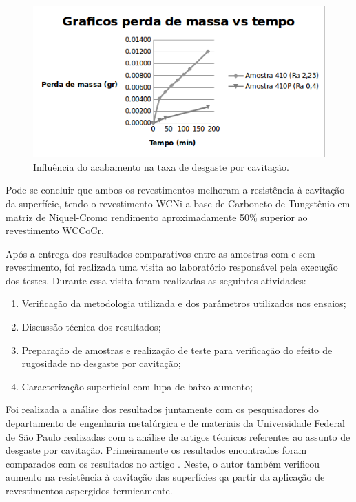 \begin{figure}
	\centering
	\includegraphics[width=1\columnwidth]{method/figs/adequacao/adequacao7.png}
    \caption{Influência do acabamento na taxa de desgaste por cavitação.}
    \label{fig:adequacao7}
\end{figure}

Pode-se concluir que ambos os revestimentos melhoram a resistência à cavitação
da superfície, tendo o revestimento WCNi a base de Carboneto de Tungstênio em
matriz de Niquel-Cromo rendimento aproximadamente 50\% superior ao revestimento
WCCoCr.

Após a entrega dos resultados comparativos entre as amostras com e sem
revestimento, foi realizada uma visita ao laboratório responsável pela execução
dos testes. Durante essa visita foram realizadas as seguintes atividades:

\begin{enumerate}
  \item Verificação da metodologia utilizada e dos parâmetros utilizados nos
  ensaios;
  \item Discussão técnica dos resultados;
  \item Preparação de amostras e realização de teste para verificação do efeito
  de rugosidade no desgaste por cavitação;
  \item Caracterização superficial com lupa de baixo aumento; 
\end{enumerate}

Foi realizada a análise dos resultados juntamente com os pesquisadores do
departamento de engenharia metalúrgica e de materiais da Universidade Federal de São Paulo 
realizadas com a análise de artigos técnicos referentes ao assunto de desgaste
por cavitação. Primeiramente os resultados encontrados foram comparados com os
resultados no artigo \cite{santa2009slurry}. Neste, o autor também verificou
aumento na resistência à cavitação das superfícies qa partir da aplicação de
revestimentos aspergidos termicamente.

